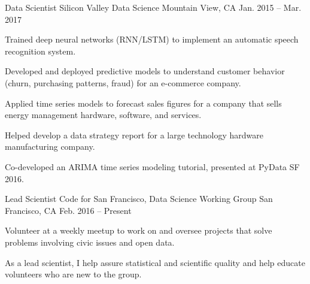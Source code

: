 

\begin{cventries}

  \cventry
    {Data Scientist} %
    {Silicon Valley Data Science} %
    {Mountain View, CA} %
    {Jan. 2015 -- Mar. 2017} %
    {
      \begin{cvitems} %
        \item {Trained deep neural networks (RNN/LSTM) to implement an automatic speech recognition system.}
        \item {Developed and deployed predictive models to understand customer behavior (churn, purchasing patterns, fraud) for an e-commerce company.}
        \item {Applied time series models to forecast sales figures for a company that sells energy management hardware, software, and services.}
        \item {Helped develop a data strategy report for a large technology hardware manufacturing company.}
        \item {Co-developed an ARIMA time series modeling tutorial, presented at PyData SF 2016.}
      \end{cvitems}
    }

  \cventry
    {Lead Scientist} %
    {Code for San Francisco, Data Science Working Group} %
    {San Francisco, CA} %
    {Feb. 2016 -- Present} %
    {
      \begin{cvitems} %
        \item {Volunteer at a weekly meetup to work on and oversee projects that solve problems involving civic issues and open data.}
        \item {As a lead scientist, I help assure statistical and scientific quality and help educate volunteers who are new to the group.}
      \end{cvitems}
    }


\end{cventries}
